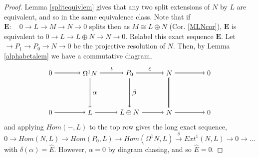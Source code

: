 \documentclass[11.5pt, twoside, a4paper, titlepage]{report}
\theoremstyle{definition}
\theoremstyle{plain}
\begin{document}
\begin{proof}
Lemma \ref{splitequivlem} gives that any two split extensions of $N$ by $L$ are equivalent, and so in the same equivalence class. Note that if $\mathbf{E}: \quad0 \xrightarrow{} L \xrightarrow{}M \xrightarrow{}N \xrightarrow{} 0$ splits then as $M \cong L\oplus N$ (Cor. \ref{MLNcor}), $\mathbf{E}$ is equivalent to $0 \xrightarrow{}L \xrightarrow{} L \oplus N \xrightarrow{} N \xrightarrow{} 0$. Relabel this exact sequence $\mathbf{E}$. Let $\xrightarrow{} P_1 \xrightarrow{}P_0 \xrightarrow{} N \xrightarrow{}0$ be the projective resolution of $N$. Then, by Lemma \ref{alphabetalem} we have a commutative diagram,
\begin{equation*}
\begin{tikzpicture}[->,-latex, auto, main path/.style={->, semithick}, main node/.style={}]
\node	[main node]		(2) at (0,0)		{$0$};
\node	[main node]		(3) at (2,0)		{$\Omega^1N$};
\node [main node]		(4) at (4,0)		{$P_0$};
\node [main node]		(5) at (6,0)		{$N$};
\node	[main node]		(11) at (8,0)		{$0$};

\node	[main node]		(7) at (0,-2)		{$0$};
\node	[main node]		(8) at (2,-2)		{$L$};
\node [main node]		(9) at (4,-2)		{$L\oplus N$};
\node [main node]		(10) at (6,-2)	{$N$};
\node [main node]		(13) at (8,-2)	{$0$};

\draw (2) edge [main path]  (3);
\draw (3) edge [main path]  node [auto] {$\iota$} (4);
\draw (4) edge [main path]  node [auto] {$\epsilon$} (5);
\draw (5) edge [main path] (11);

\draw (7) edge [main path] node [auto] {$$} (8);
\path (8) edge [main path] node [auto, swap] {$$} (9);
\draw (9) edge [main path] node [auto, swap] {$$} (10);
\draw (10) edge [main path] node [auto, swap] {$$} (13);

\draw (3) edge [main path] node [auto] {$\alpha$} (8);
\draw (4) edge [main path] node [auto] {$\beta$} (9);
\draw (5) edge [-, double, semithick, double distance=1.5pt] (10);
\end{tikzpicture}
\end{equation*}
and applying $Hom(-,L)$ to the top row gives the long exact sequence, 
\begin{equation*}
0 \xrightarrow{} Hom(N,L) \xrightarrow{} Hom(P_0, L) \xrightarrow{} Hom(\Omega^1N, L) \xrightarrow{\delta} Ext^1(N,L) \xrightarrow{} 0 \xrightarrow{} \dots
\end{equation*}
with $\delta(\alpha)=\hat{E}$. However, $\alpha=0$ by diagram chasing, and so $\hat{E}=0$.
\end{proof}
\end{document}
